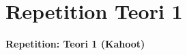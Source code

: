 \section{Repetition Teori 1}

\begin{frame}
  \vspace{3em}
  \begin{center}
    {\LARGE \textbf{Repetition: Teori 1 (Kahoot)}}
  \end{center}
\end{frame}